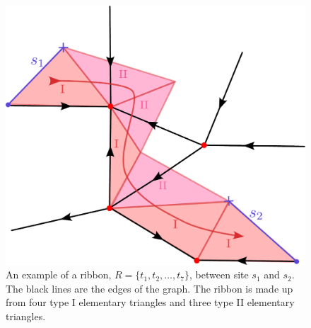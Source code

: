 \documentclass[a4paper,twocolumn,11pt, accepted=2024-06-14]{quantumarticle}
\begin{document}
\begin{figure}
    \centering
    \includegraphics[width= \linewidth]{Figures/ribbon_exampl.pdf}
    \caption{An example of a ribbon, $R = \{t_1, t_2, \ldots, t_7\}$, between site $s_1$ and $s_2$. The black lines are the edges of the graph. The ribbon is made up from four type I elementary triangles and three type II elementary triangles.}
    \label{fig:rib_exampl}
\end{figure}
\end{document}
